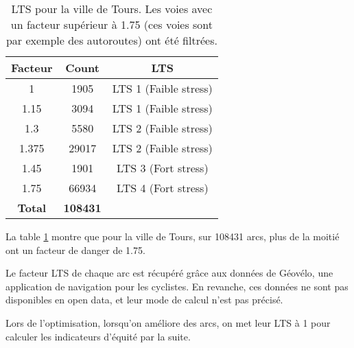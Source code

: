 \documentclass[a4paper,12pt,french]{article}
\begin{document}
\begin{table}[h]
\centering
\caption{LTS pour la ville de Tours. Les voies avec un facteur supérieur à 1.75 (ces voies sont par exemple des autoroutes) ont été filtrées.}
\vspace{0.5cm}
\begin{tabular}{|c|c|c|}
\hline
\textbf{Facteur} & \textbf{Count} & \textbf{LTS} \\
\hline
1 & 1905 & LTS 1 (Faible stress) \\
1.15 &3094 &LTS 1 (Faible stress)\\
1.3 &5580 &LTS 2 (Faible stress)\\
1.375& 29017& LTS 2 (Faible stress)\\
1.45 &1901 &LTS 3 (Fort stress)\\
1.75 &66934 &LTS 4 (Fort stress)\\
 \hline 
 \textbf{Total} & \textbf{108431} & \\
 \hline 
 \end{tabular}
\label{table:lts_tours}
\end{table}

La table \ref{table:lts_tours} montre que pour la ville de Tours, sur 108431 arcs, plus de la moitié ont un facteur de danger de 1.75. 

Le facteur LTS de chaque arc est récupéré grâce aux données de Géovélo, une application de navigation pour les cyclistes. En revanche, ces données ne sont pas disponibles en open data, et leur mode de calcul n'est pas précisé. 

Lors de l'optimisation, lorsqu'on améliore des arcs, on met leur LTS à 1 pour calculer les indicateurs d'équité par la suite.
\end{document}
